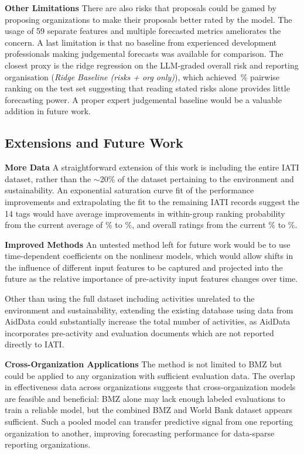 \documentclass[12pt,a4paper]{article}
\begin{document}
\textbf{Other Limitations}
There are also risks that proposals could be gamed by proposing organizations to make their proposals better rated by the model. The usage of 59 separate features and multiple forecasted metrics ameliorates the concern. A last limitation is that no baseline from experienced development professionals making judgemental forecasts was available for comparison. The closest proxy is the ridge regression on the LLM-graded overall risk and reporting organisation (\emph{Ridge Baseline (risks + org only)}), which achieved \PairwiseHuman\,\% pairwise ranking on the test set suggesting that reading stated risks alone provides little forecasting power. A proper expert judgemental baseline would be a valuable addition in future work.

\subsection{Extensions and Future Work}
\textbf{More Data}
A straightforward extension of this work is including the entire IATI dataset, rather than the $\sim$20\% of the dataset pertaining to the environment and sustainability. An exponential saturation curve fit of the performance improvements and extrapolating the fit to the remaining IATI records suggest the 14 tags would have average improvements in within-group ranking probability from the current average of \OutcomeTagPairwiseAvg \% to \OutcomeTagPairwiseAvgExtrapolated \%, and overall ratings from the current \PairwiseModel \% to \PairwiseModelExtrapolated \%.

\textbf{Improved Methods}
An untested method left for future work would be to use time-dependent coefficients on the nonlinear models, which would allow shifts in the influence of different input features to be captured and projected into the future as the relative importance of pre-activity input features changes over time.

Other than using the full dataset including activities unrelated to the environment and sustainability, extending the existing database using data from AidData could substantially increase the total number of activities, as AidData incorporates pre-activity and evaluation documents which are not reported directly to IATI.


\textbf{Cross-Organization Applications}
The method is not limited to BMZ but could be applied to any organization with sufficient evaluation data. The overlap in effectiveness data across organizations suggests that cross-organization models are feasible and beneficial: BMZ alone may lack enough labeled evaluations to train a reliable model, but the combined BMZ and World Bank dataset appears sufficient. Such a pooled model can transfer predictive signal from one reporting organization to another, improving forecasting performance for data-sparse reporting organizations.
\end{document}
